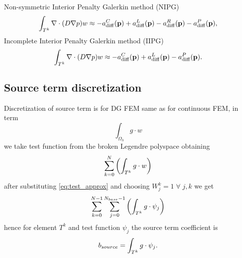 Non-symmetric Interior Penalty Galerkin method (NIPG)
\begin{equation}\label{eq:nipg}
\int_{T^k}\nabla\cdot(D\nabla p) w \approx - a^C_\mathrm{diff}(\mathbf{p})  
    + a^L_\mathrm{diff}(\mathbf{p}) - a^R_\mathrm{diff}(\mathbf{p})  
    - a^P_\mathrm{diff}(\mathbf{p}),
\end{equation}
Incomplete Interior Penalty Galerkin method (IIPG)
\begin{equation}\label{eq:iipg}
\int_{T^k}\nabla\cdot(D\nabla p) w \approx - a^C_\mathrm{diff}(\mathbf{p})  
    + a^L_\mathrm{diff}(\mathbf{p})
    - a^P_\mathrm{diff}(\mathbf{p}).
\end{equation}

\subsection{Source term discretization}
\label{se:source_term}
Discretization of source term is for DG FEM same as for continuous FEM, 
in term
\begin{equation}
    \int_{\Omega_h} g\cdot w
\end{equation}
we take test function from the broken Legendre polyspace obtaining 
\begin{equation}
    \sum\limits_{k=0}^{N}\left(\int_{T^k} g\cdot w\right)
\end{equation}
after substituting \eqref{eq:test_approx} and choosing $W_j^k = 1 \; \forall \; 
j, k$ we get
\begin{equation}
\sum\limits_{k=0}^{N - 1}\sum\limits_{j=0}^{N_{base} - 1}\left(\int_{T^k} g\cdot 
\psi_j \right)
\end{equation}
hence for element $T^k$ and test function $\psi_j$ the source term coefficient 
is
\begin{equation}
    b_{source} = \int_{T^k} g\cdot \psi_j.
\end{equation}

\newpage
